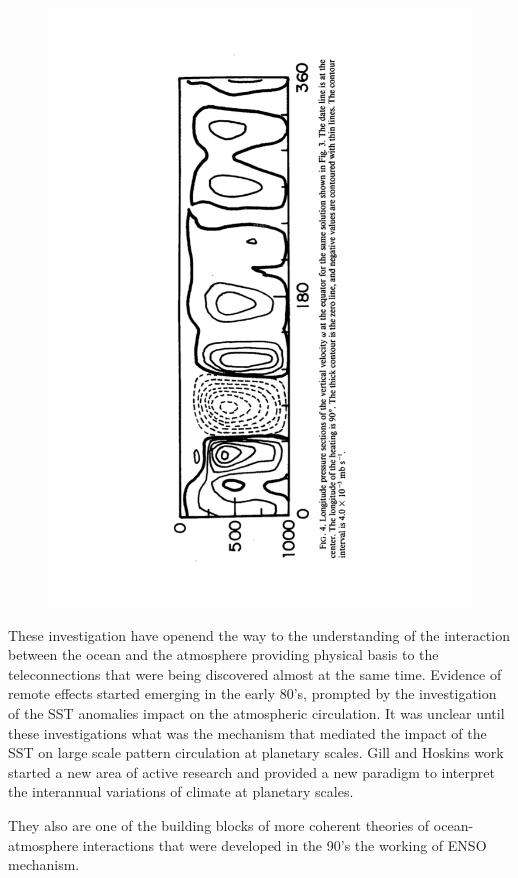 \begin{figure}
\centering
\includegraphics[width = .7 \textwidth]{figs/GD/Heat3.png}
\caption{}
\end{figure}

These investigation have openend the way to the understanding of the
interaction between the ocean and the atmosphere providing physical
basis to the teleconnections that were being discovered almost at the
same time. Evidence of remote effects started emerging in the early
80's, prompted by the investigation of the SST anomalies impact on the
atmospheric circulation. It was unclear until these investigations what
was the mechanism that mediated the impact of the SST on large scale
pattern circulation at planetary scales. Gill and Hoskins work started a
new area of active research and provided a new paradigm to interpret the
interannual variations of climate at planetary scales.

They also are one of the building blocks of more coherent theories of
ocean-atmosphere interactions that were developed in the 90's the working of ENSO mechanism.

